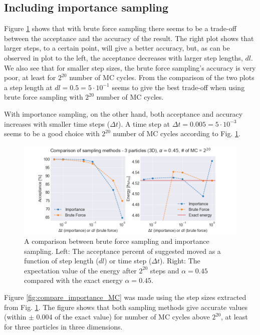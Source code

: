 \subsection{Including importance sampling}

Figure \ref{fig:compare_importance_steps} shows that with brute force sampling there seems to be a trade-off between the acceptance and the accuracy of the result. The right plot shows that larger steps, to a certain point, will give a better accuracy, but, as can be observed in plot to the left, the acceptance decreases with larger step lengths, $dl$. We also see that for smaller step sizes, the brute force sampling's accuracy is very poor, at least for $2^{20}$ number of MC cycles. From the comparison of the two plots a  step length at $dl = 0.5 = 5\cdot10^{-1}$ seems to give the best trade-off when using brute force sampling with $2^{20}$ number of MC cycles.

With importance sampling, on the other hand, both acceptance and accuracy increases with smaller time steps ($\Delta t$). A time step at $\Delta t = 0.005 = 5\cdot10^{-3}$ seems to be a good choice with $2^{20}$ number of MC cycles according to Fig. \ref{fig:compare_importance_steps}. 

\begin{figure}[H]
\center
\includegraphics[width=\linewidth]{../Results/comparison_steps_importance}\caption{A comparison between brute force sampling and importance sampling. Left: The acceptance percent of suggested moved as a function of step length ($dl$) or time step ($\Delta t$). Right: The expectation value of the energy after $2^{20}$ steps and $\alpha = 0.45$ compared with the exact energy $\alpha = 0.45$. }\label{fig:compare_importance_steps}
\end{figure}

Figure \ref{fig:compare_importance_MC} was made using the step sizes extracted from Fig. \ref{fig:compare_importance_steps}. The figure shows that both sampling methods give accurate values (within $\pm$ 0.004 of the exact value) for number of MC cycles above $2^{20}$, at least for three particles in three dimensions.

